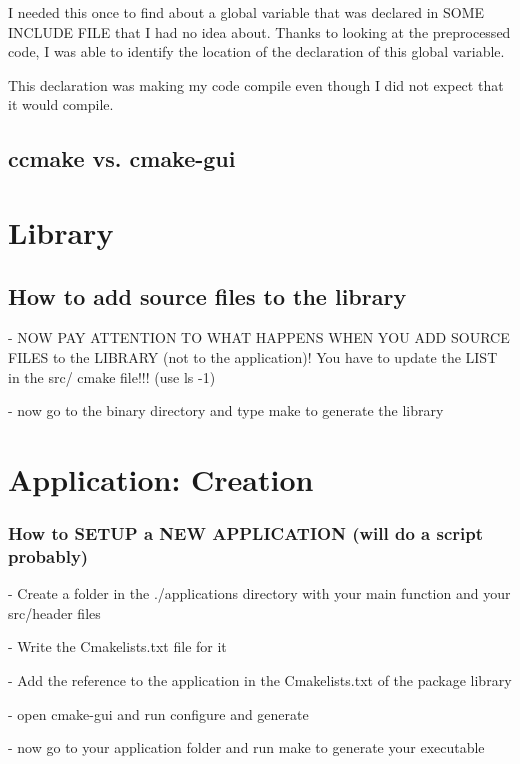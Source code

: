 \documentclass[10pt]{book}
\begin{document}
  I needed this once to find about a global variable that was declared in SOME INCLUDE FILE
  that I had no idea about. Thanks to looking at the preprocessed code, I was able to identify
  the location of the declaration of this global variable.
  
  This declaration was making my code compile even though I did not expect that it would compile.
  

\chapter{ccmake vs. cmake-gui}


\part{Library}


 \chapter{How to add source files to the library}
 
- NOW PAY ATTENTION TO WHAT HAPPENS WHEN YOU ADD SOURCE FILES to the LIBRARY (not to the application)! You have to 
update the LIST in the src/ cmake file!!! (use ls -1)

- now go to the binary directory and type make to generate the library



\part{Application: Creation}
  
  
\section{How to SETUP a NEW APPLICATION (will do a script probably)}

- Create a folder in the ./applications directory with your main function and your src/header files

- Write the Cmakelists.txt file for it

- Add the reference to the application in the Cmakelists.txt of the package library

- open cmake-gui and run configure and generate


- now go to your application folder and run make to generate your executable


 
\end{document}

